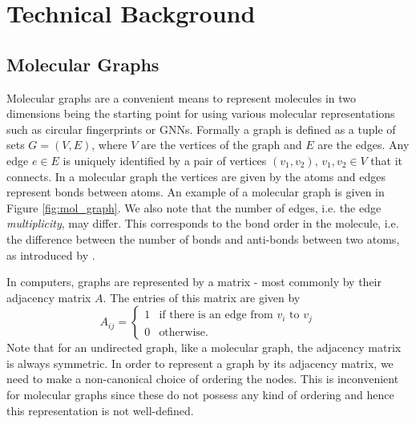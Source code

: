 \section{Technical Background}
\subsection{Molecular Graphs}
\label{sec:mol_graphs}
Molecular graphs are a convenient means to represent molecules in two dimensions being the starting point for using various molecular representations such as circular fingerprints or GNNs. Formally a graph is defined as a tuple of sets $G = (V,E)$, where $V$ are the vertices of the graph and $E$ are the edges. Any edge $e \in E$ is uniquely identified by a pair of vertices $(v_1, v_2), \, v_1, v_2 \in V$ that it connects. In a molecular graph the vertices are given by the atoms and edges represent bonds between atoms. An example of a molecular graph is given in Figure \ref{fig:mol_graph}. We also note that the number of edges, i.e. the edge \emph{multiplicity}, may differ. This corresponds to the bond order in the molecule, i.e. the difference between the number of bonds and anti-bonds between two atoms, as introduced by \cite{pauling}. 

In computers, graphs are represented by a matrix - most commonly by their adjacency matrix $A$. The entries of this matrix are given by 
\begin{equation}
A_{ij} = 
\begin{cases}
1 & \text{if there is an edge from } v_i \text{ to } v_j \\
0 & \text{otherwise.}
\end{cases}
\end{equation}
Note that for an undirected graph, like a molecular graph, the adjacency matrix is always symmetric. In order to represent a graph by its adjacency matrix, we need to make a non-canonical choice of ordering the nodes. This is inconvenient for molecular graphs since these do not possess any kind of ordering and hence this representation is not well-defined. 


